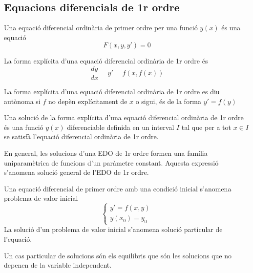 \documentclass[../main.tex]{subfiles}
\begin{document}
\subsection{Equacions diferencials de 1r ordre}
\begin{definicio}
    Una equació diferencial ordinària de primer ordre per una funció $y(x)$ és una equació
    \begin{displaymath}
        F(x,y,y') = 0
    \end{displaymath}
\end{definicio}
\begin{definicio}
    La forma explícita d'una equació diferencial ordinària de 1r ordre és
    \begin{displaymath}
        \frac{dy}{dx} = y' = f\left(x, f\left(x\right)\right)
    \end{displaymath}
\end{definicio}
\begin{definicio}
    La forma explícita d'una equació diferencial ordinària de 1r ordre es diu autònoma si $f$ no
    depèn explícitament de $x$ o sigui, és de la forma $y' = f(y)$
\end{definicio}
\begin{definicio}
    Una solució de la forma explícita d'una equació diferencial ordinària de 1r ordre és una funció
    $y(x)$ diferenciable definida en un interval $I$ tal que per a tot $x \in I$ se satisfà
    l'equació diferencial ordinària de 1r ordre.
\end{definicio}
En general, les solucions d'una EDO de 1r ordre formen una família uniparamètrica de funcions d'un
paràmetre constant. Aquesta expressió s'anomena solució general de l'EDO de 1r ordre.
\begin{definicio}
    Una equació diferencial de primer ordre amb una condició inicial s'anomena problema de valor inicial
    \begin{displaymath}
        \begin{cases}
            y' = f(x, y)\\
            y(x_0) = y_0
        \end{cases}
    \end{displaymath}
    La solució d'un problema de valor inicial s'anomena solució particular de l'equació.
\end{definicio}
\begin{definicio}
    Un cas particular de solucions són els equilibris que són les solucions que no depenen de la
    variable independent.
\end{definicio}
\end{document}
